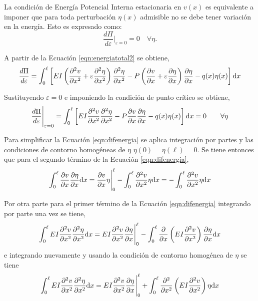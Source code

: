 La condición de Energía Potencial Interna estacionaria en $v(x)$ es equivalente a imponer que para toda perturbación $\eta(x)$ admisible no se debe tener variación en la energía. Esto es expresado como:
%
\begin{equation}
\frac{d\Pi}{d\varepsilon} \Bigg|_{\varepsilon=0} = 0 \quad \forall \eta .
\end{equation}

A partir de la Ecuación \eqref{eqn:energiatotal2} se obtiene,
\begin{equation}
\frac{d\Pi}{d\varepsilon} = \int_0^\ell \left[ EI \left( \frac{\partial^2 v}{\partial x^2} + \varepsilon\frac{\partial^2 \eta}{\partial x^2} \right) \frac{\partial^2 \eta}{\partial x^2} - P \left(\frac{\partial v}{\partial x} + \varepsilon\frac{\partial \eta}{\partial x}\right)\frac{\partial \eta}{\partial x}- q(x) \eta(x) \right] {\text{d}} x
\end{equation}

Sustituyendo $\varepsilon=0$ e imponiendo la condición de punto crítico se obtiene,
%
\begin{equation}\label{eqn:difenergia}
\frac{d\Pi}{d\varepsilon} \Bigg|_{\varepsilon=0} = \int_0^\ell \left[ EI \frac{\partial^2 v}{\partial x^2} \frac{\partial^2 \eta}{\partial x^2} - P \frac{\partial v}{\partial x}\frac{\partial \eta}{\partial x}- q(x) \eta(x) \right] {\text{d}} x = 0 \qquad \forall \eta
\end{equation}

Para simplificar la Ecuación \eqref{eqn:difenergia} se aplica integración por partes y las condiciones de contorno homogéneas de $\eta$ $\eta(0)=\eta(\ell)=0$. %
%
Se tiene entonces que para el segundo término de la Ecuación \eqref{eqn:difenergia},
%
\begin{equation}\label{eqn:partes1}
\int_0^\ell \frac{\partial v}{\partial x} \frac{\partial \eta}{\partial x}{\text{d}} x = \frac{\partial v}{\partial x}\eta\Bigg|_0^\ell - \int_0^\ell \frac{\partial^2 v}{\partial x^2} \eta{\text{d}} x 
= -\int_0^\ell \frac{\partial^2 v}{\partial x^2} \eta{\text{d}} x
\end{equation}

Por otra parte para el primer término de la Ecuación \eqref{eqn:difenergia} integrando por parte una vez se tiene,
%
$$
\int_0^\ell EI\frac{\partial^2 v}{\partial x^2} \frac{\partial^2 \eta}{\partial x^2}\dif x %
%
= EI\frac{\partial^2 v}{\partial x^2} \frac{\partial \eta}{\partial x}\Bigg|_0^\ell - \int_0^\ell \frac{\partial}{\partial x} \left( EI\frac{\partial^2 v}{\partial x^2} \right) \frac{\partial \eta}{\partial x}\dif x %
$$
e integrando nuevamente y usando la condición de contorno homogénea de $\eta$ se tiene
%
\begin{equation}\label{eqn:partes2}
\int_0^\ell EI\frac{\partial^2 v}{\partial x^2} \frac{\partial^2 \eta}{\partial x^2}\dif x %
%
= EI\frac{\partial^2 v}{\partial x^2} \frac{\partial \eta}{\partial x}\Bigg|_0^\ell %
%
+ \int_0^\ell \frac{\partial^2}{\partial x^2} \left( EI \frac{\partial^2 v}{\partial x^2} \right) \eta\dif x
\end{equation}


